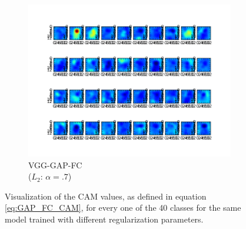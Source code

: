 \documentclass[12pt, letterpaper, twoside]{article}
\begin{document}
\begin{figure}[h]
			\begin{subfigure}[t]{0.32\textwidth}
				\includegraphics[width=\textwidth]{GAP_orig_L2_1e7}
				\caption{VGG-GAP-FC \\ ($L_2$: $\alpha=.7$)}
			\end{subfigure}
			\centering
			\caption{Visualization of the CAM values, as defined in equation \ref{eq:GAP_FC_CAM}, for every one of the 40 classes for the same model trained with different regularization parameters.}
			\label{fig:CAM_with_GAP_original_regularized}
		\end{figure}
\end{document}
